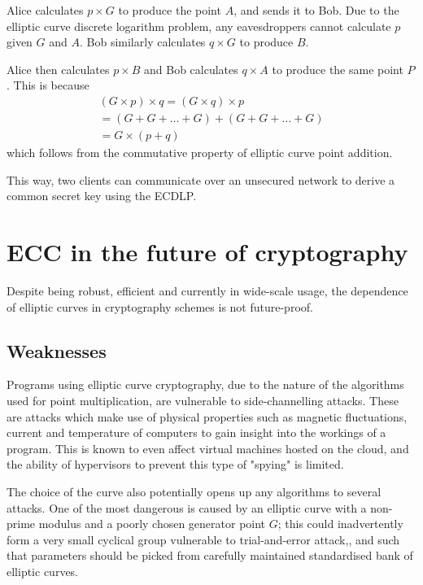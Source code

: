 \documentclass[a4paper]{article}
\begin{document}
Alice calculates $p \times G$ to produce the point $A$, and sends it to Bob. Due to the elliptic curve discrete logarithm problem, any eavesdroppers cannot calculate  $p$ given $G$ and $A$. Bob similarly calculates $q \times G$ to produce $B$.

Alice then calculates $p \times B$ and Bob calculates $q \times A$ to produce the same point $P$. This is because 
\begin{align*}
    (G \times p) \times q = (G \times q) \times p \\
    = (G + G + \dots + G) + (G + G + \dots + G) \\
    = G \times (p + q)
\end{align*}
which follows from the commutative property of elliptic curve point addition.

This way, two clients can communicate over an unsecured network to derive a common secret key using the ECDLP.\cite{practical}


\section{ECC in the future of cryptography}

Despite being robust, efficient and currently in wide-scale usage, the dependence of elliptic curves in cryptography schemes is not future-proof.

\subsection{Weaknesses}\label{weak}
Programs using elliptic curve cryptography, due to the nature of the algorithms used for point multiplication, are vulnerable to side-channelling attacks.\cite{nist} These are attacks which make use of physical properties such as magnetic fluctuations, current and temperature of computers to gain insight into the workings of a program. This is known to even affect virtual machines hosted on the cloud, and the ability of hypervisors to prevent this type of "spying" is limited.\cite{cloud}

The choice of the curve also potentially opens up any algorithms to several attacks. One of the most dangerous is caused by an elliptic curve with a non-prime modulus and a poorly chosen generator point $G$; this could inadvertently form a very small cyclical group vulnerable to trial-and-error attack,\cite{practical}, and such that parameters should be picked from carefully maintained standardised bank of elliptic curves.\cite{sec}
\end{document}
